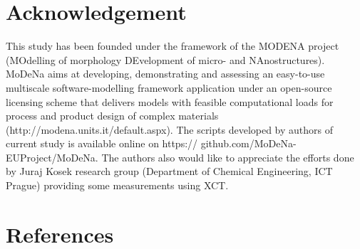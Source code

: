 \documentclass[review]{elsarticle}
\begin{document}
\section*{Acknowledgement}
This study has been founded under the framework of the MODENA project (MOdelling of morphology DEvelopment of micro- and NAnostructures). MoDeNa aims at developing, demonstrating and assessing an easy-to-use multiscale software-modelling framework application under an open-source licensing scheme that delivers models with feasible computational loads for process and product design of complex materials (http://modena.units.it/default.aspx). The scripts developed by authors of current study is available online on https:// github.com/MoDeNa-EUProject/MoDeNa. The authors also would like to appreciate the efforts done by Juraj Kosek research group (Department of Chemical Engineering, ICT Prague) providing some measurements using XCT.


\section*{References}


\end{document}
